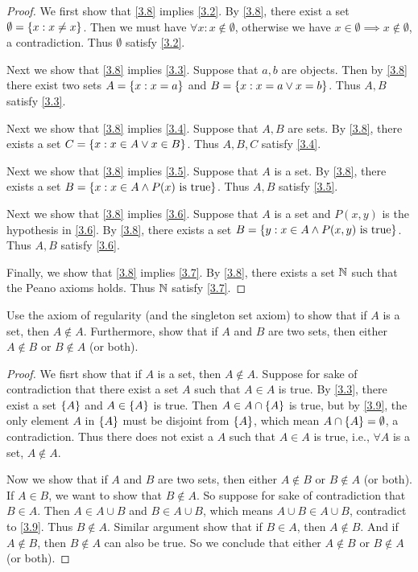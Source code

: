 \begin{proof}
  We first show that \cref{3.8} implies \cref{3.2}.
  By \cref{3.8}, there exist a set \(\emptyset = \left\lbrace x: x \neq x\right\rbrace\).
  Then we must have \(\forall x : x \notin \emptyset\), otherwise we have \(x \in \emptyset \implies x \notin \emptyset\), a contradiction.
  Thus \(\emptyset\) satisfy \cref{3.2}.

  Next we show that \cref{3.8} implies \cref{3.3}.
  Suppose that \(a, b\) are objects.
  Then by \cref{3.8} there exist two sets \(A = \left\lbrace x: x = a\right\rbrace\) and \(B = \left\lbrace x: x = a \lor x = b\right\rbrace\).
  Thus \(A, B\) satisfy \cref{3.3}.

  Next we show that \cref{3.8} implies \cref{3.4}.
  Suppose that \(A, B\) are sets.
  By \cref{3.8}, there exists a set \(C = \left\lbrace x : x \in A \lor x \in B\right\rbrace\).
  Thus \(A, B, C\) satisfy \cref{3.4}.

  Next we show that \cref{3.8} implies \cref{3.5}.
  Suppose that \(A\) is a set.
  By \cref{3.8}, there exists a set \(B = \left\lbrace x : x \in A \land P(x) \text{ is true}\right\rbrace\).
  Thus \(A, B\) satisfy \cref{3.5}.

  Next we show that \cref{3.8} implies \cref{3.6}.
  Suppose that \(A\) is a set and \(P(x, y)\) is the hypothesis in \cref{3.6}.
  By \cref{3.8}, there exists a set \(B = \left\lbrace y :  x \in A \land P(x, y) \text{ is true}\right\rbrace\).
  Thus \(A, B\) satisfy \cref{3.6}.

  Finally, we show that \cref{3.8} implies \cref{3.7}.
  By \cref{3.8}, there exists a set \(\mathbb{N}\) such that the Peano axioms holds.
  Thus \(\mathbb{N}\) satisfy \cref{3.7}.
\end{proof}

\begin{ex}\label{ex:3.2.2}
  Use the axiom of regularity (and the singleton set axiom) to show that if \(A\) is a set, then \(A \notin A\).
  Furthermore, show that if \(A\) and \(B\) are two sets, then either \(A \notin B\) or \(B \notin A\) (or both).
\end{ex}

\begin{proof}
  We fisrt show that if \(A\) is a set, then \(A \notin A\).
  Suppose for sake of contradiction that there exist a set \(A\) such that \(A \in A\) is true.
  By \cref{3.3}, there exist a set \(\left\lbrace A\right\rbrace\) and \(A \in \left\lbrace A\right\rbrace\) is true.
  Then \(A \in A \cap \left\lbrace A\right\rbrace\) is true, but by \cref{3.9}, the only element \(A\) in \(\left\lbrace A\right\rbrace\) must be disjoint from \(\left\lbrace A\right\rbrace\), which mean \(A \cap \left\lbrace A\right\rbrace = \emptyset\), a contradiction.
  Thus there does not exist a \(A\) such that \(A \in A\) is true, i.e., \(\forall A\) is a set, \(A \notin A\).

  Now we show that if \(A\) and \(B\) are two sets, then either \(A \notin B\) or \(B \notin A\) (or both).
  If \(A \in B\), we want to show that \(B \notin A\).
  So suppose for sake of contradiction that \(B \in A\).
  Then \(A \in A \cup B\) and \(B \in A \cup B\), which means \(A \cup B \in A \cup B\), contradict to \cref{3.9}.
  Thus \(B \notin A\).
  Similar argument show that if \(B \in A\), then \(A \notin B\).
  And if \(A \notin B\), then \(B \notin A\) can also be true.
  So we conclude that either \(A \notin B\) or \(B \notin A\) (or both).
\end{proof}

